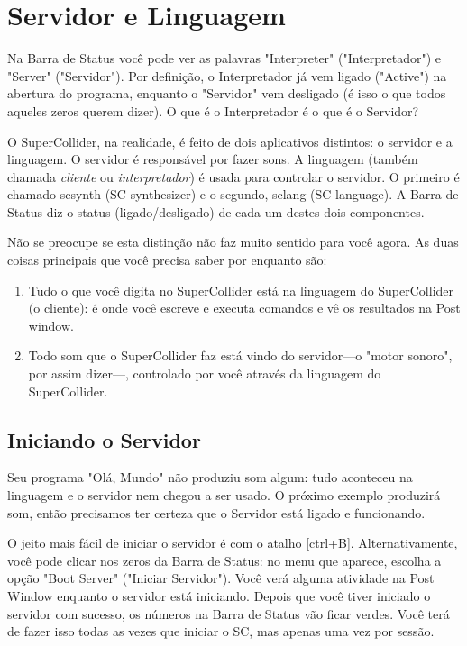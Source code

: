 \section{Servidor e Linguagem}

Na Barra de Status você pode ver as palavras "Interpreter" ("Interpretador") e "Server" ("Servidor"). Por definição, o Interpretador já vem ligado ("Active") na abertura do programa, enquanto o "Servidor" vem desligado (é isso o que todos aqueles zeros querem dizer). O que é o Interpretador é o que é o Servidor?

O SuperCollider, na realidade, é feito de dois aplicativos distintos: o servidor e a linguagem. O servidor é responsável por fazer sons. A linguagem (também chamada \emph{cliente} ou \emph{interpretador}) é usada para controlar o servidor. O primeiro é chamado scsynth (SC-synthesizer) e o segundo, sclang (SC-language). A Barra de Status diz o status (ligado/desligado) de cada um destes dois componentes.

Não se preocupe se esta distinção não faz muito sentido para você agora. As duas coisas principais que você precisa saber por enquanto são:

\begin{enumerate}
\item Tudo o que você digita no SuperCollider está na linguagem do SuperCollider (o cliente): é onde você escreve e executa comandos e vê os resultados na Post window.
\item Todo som que o SuperCollider faz está vindo do servidor---o "motor sonoro", por assim dizer---, controlado por você através da linguagem do SuperCollider.
\end{enumerate}

\subsection{Iniciando o Servidor}
Seu programa "Olá, Mundo" não produziu som algum: tudo aconteceu na linguagem e o servidor nem chegou a ser usado. O próximo exemplo produzirá som, então precisamos ter certeza que o Servidor está ligado e funcionando.

O jeito mais fácil de iniciar o servidor é com o atalho [ctrl+B]. Alternativamente, você pode clicar nos zeros da Barra de Status: no menu que aparece, escolha a opção "Boot Server" ("Iniciar Servidor"). Você verá alguma atividade na Post Window enquanto o servidor está iniciando. Depois que você tiver iniciado o servidor com sucesso, os números na Barra de Status vão ficar verdes. Você terá de fazer isso todas as vezes que iniciar o SC, mas apenas uma vez por sessão.


